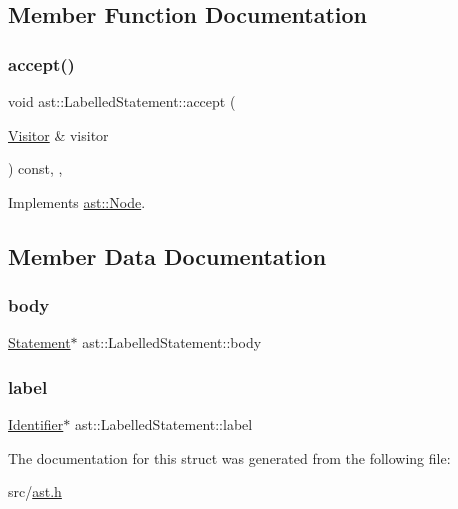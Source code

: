\subsection{Member Function Documentation}
\mbox{\label{structast_1_1_labelled_statement_ad47515643d78baba052d18301b134f69}} 
\subsubsection{\texorpdfstring{accept()}{accept()}}
{\footnotesize\ttfamily void ast\+::\+Labelled\+Statement\+::accept (\begin{DoxyParamCaption}\item[{\hyperlink{structast_1_1_visitor}{Visitor} \&}]{visitor }\end{DoxyParamCaption}) const\hspace{0.3cm}{\ttfamily [inline]}, {\ttfamily [override]}, {\ttfamily [virtual]}}



Implements \hyperlink{structast_1_1_node_abc089ee6caaf06a4445ebdd8391fdebc}{ast\+::\+Node}.



\subsection{Member Data Documentation}
\mbox{\label{structast_1_1_labelled_statement_a235fcc267aa2fe36d6f224a5935e1398}} 
\subsubsection{\texorpdfstring{body}{body}}
{\footnotesize\ttfamily \hyperlink{structast_1_1_statement}{Statement}$\ast$ ast\+::\+Labelled\+Statement\+::body}

\mbox{\label{structast_1_1_labelled_statement_a7e09871f58c37264bcd2a778f7c6ab50}} 
\subsubsection{\texorpdfstring{label}{label}}
{\footnotesize\ttfamily \hyperlink{structast_1_1_identifier}{Identifier}$\ast$ ast\+::\+Labelled\+Statement\+::label}



The documentation for this struct was generated from the following file\+:\begin{DoxyCompactItemize}
\item 
src/\hyperlink{ast_8h}{ast.\+h}\end{DoxyCompactItemize}
